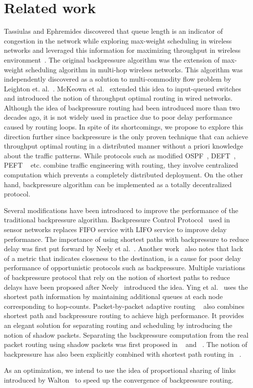 \label{sec:related}
\section{Related work}

Tassiulas and Ephremides discovered that queue length is an indicator of congestion in the network while exploring max-weight scheduling in wireless networks and leveraged this information for maximizing throughput in wireless environment~\cite{BP-orig}. The original backpressure algorithm was the extension of max-weight scheduling algorithm in multi-hop wireless networks. This algorithm was independently discovered as a solution to multi-commodity flow problem by Leighton et. al.~\cite{Leighton1}. McKeown et al.~\cite{nick1} extended this idea to input-queued switches and introduced the notion of throughput optimal routing in wired networks. Although the idea of backpressure routing had been introduced more than two decades ago, it is not widely used in practice due to poor delay performance caused by routing loops. In spite of its shortcomings, we propose to explore this direction further since backpressure is the only proven technique that can achieve throughput optimal routing in a distributed manner without a priori knowledge about the traffic patterns. While protocols such as modified OSPF~\cite{mOSPF}, DEFT~\cite{DEFT}, PEFT ~\cite{PEFT} etc. combine traffic engineering with routing, they involve centralized computation which prevents a completely distributed deployment. On the other hand, backpressure algorithm can be implemented as a totally decentralized protocol.

Several modifications have been introduced to improve the performance of the traditional backpressure algorithm. Backpressure Control Protocol~\cite{BCP} used in sensor networks replaces FIFO service with LIFO service to improve delay performance. The importance of using shortest paths with backpressure to reduce delay was first put forward by Neely et al.~\cite{Neely1}. Another work~\cite{SP1} also notes that lack of a metric that indicates closeness to the destination, is a cause for poor delay performance of opportunistic protocols such as backpressure. Multiple variations of backpressure protocol that rely on the notion of shortest paths to reduce delays have been proposed after Neely~\cite{Neely1} introduced the idea. Ying et al.~\cite{Austin1} uses the shortest path information by maintaining additional queues at each node corresponding to hop-counts. Packet-by-packet adaptive routing ~\cite{Srikant3} also combines shortest path and backpressure routing to achieve high performance. It provides an elegant solution for separating routing and scheduling by introducing the notion of shadow packets. Separating the backpressure computation from the real packet routing using shadow packets was first proposed in ~\cite{Srikant1} and ~\cite{Srikant2}. The notion of backpressure has also been explicitly combined with shortest path routing in ~\cite{BP-lcn}.

As an optimization, we intend to use the idea of proportional sharing of links introduced by Walton~\cite{walton} to speed up the convergence of backpressure routing.